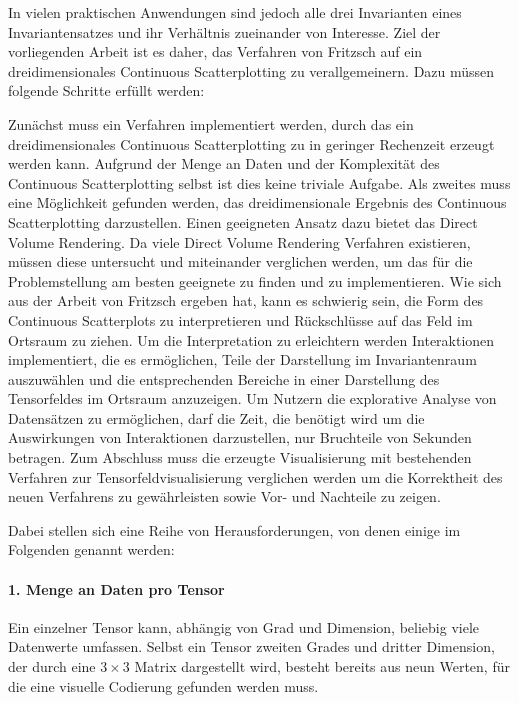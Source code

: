 \documentclass[a4paper,fontsize=12pt,toc=bib,parskip=half,ngerman]{scrartcl}
\begin{document}
In vielen praktischen Anwendungen sind jedoch alle drei Invarianten eines Invariantensatzes und ihr Verh\"altnis zueinander von Interesse. Ziel der vorliegenden Arbeit ist es daher, das Verfahren von Fritzsch auf ein dreidimensionales Continuous Scatterplotting zu verallgemeinern. Dazu m\"ussen folgende Schritte erf\"ullt werden:

Zun\"achst muss ein Verfahren implementiert werden, durch das ein dreidimensionales Continuous Scatterplotting zu in geringer Rechenzeit erzeugt werden kann. Aufgrund der Menge an Daten und der Komplexit\"at des Continuous Scatterplotting selbst ist dies keine triviale Aufgabe. Als zweites muss eine M\"oglichkeit gefunden werden, das dreidimensionale Ergebnis des Continuous Scatterplotting darzustellen. Einen geeigneten Ansatz dazu bietet das Direct Volume Rendering. Da viele Direct Volume Rendering Verfahren existieren, m\"ussen diese untersucht und miteinander verglichen werden, um das f\"ur die Problemstellung am besten geeignete zu finden und zu implementieren. Wie sich aus der Arbeit von Fritzsch ergeben hat, kann es schwierig sein, die Form des Continuous Scatterplots zu interpretieren und R\"uckschl\"usse auf das Feld im Ortsraum zu ziehen. Um die Interpretation zu erleichtern werden Interaktionen implementiert, die es erm\"oglichen, Teile der Darstellung im Invariantenraum auszuw\"ahlen und die entsprechenden Bereiche in einer Darstellung des Tensorfeldes im Ortsraum anzuzeigen. Um Nutzern die explorative Analyse von Datens\"atzen zu erm\"oglichen, darf die Zeit, die ben\"otigt wird um die Auswirkungen von Interaktionen darzustellen, nur Bruchteile von Sekunden betragen. Zum Abschluss muss die erzeugte Visualisierung mit bestehenden Verfahren zur Tensorfeldvisualisierung verglichen werden um die Korrektheit des neuen Verfahrens zu gew\"ahrleisten sowie Vor- und Nachteile zu zeigen.

Dabei stellen sich eine Reihe von Herausforderungen, von denen einige im Folgenden genannt werden\cite{fritzsch2016continuousScatterplot,hlawitschka2014top}:

\paragraph{1. Menge an Daten pro Tensor}
Ein einzelner Tensor kann, abh\"angig von Grad und Dimension, beliebig viele Datenwerte umfassen. Selbst ein Tensor zweiten Grades und dritter Dimension, der durch eine $3 \times 3$ Matrix dargestellt wird, besteht bereits aus neun Werten, f\"ur die eine visuelle Codierung gefunden werden muss.
\end{document}
